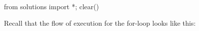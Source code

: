 \begin{python0}
from solutions import *; clear()
\end{python0}

Recall that the flow of execution for the for-loop looks like this:













         
               







